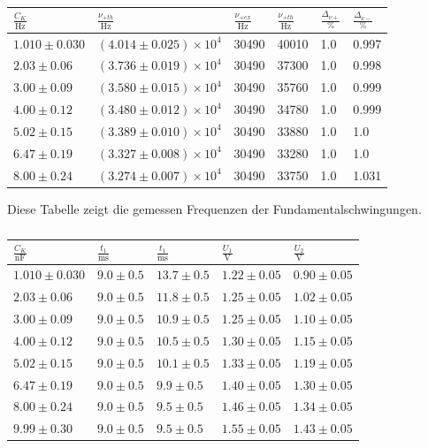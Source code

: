 \documentclass[11pt,ngerman,a4paper]{article}
\begin{document}
 \begin{table}
 \centering
\begin{tabular}{llllll}
\toprule
{$\frac{C_K}{\si{\Hz}}$} & {$\frac{\nu_{+th}}{\si{\Hz}}$} & $\frac{\nu_{+ex}}{\si{\Hz}}$ &$\frac{\nu_{+th}}{\si{\Hz}} $& $\frac{\Delta_{\nu+}}{\si{\percent}}$ &$\frac{\Delta_{\nu-}}{\si{\percent}}$\\
\midrule
 $1.010 \pm 0.030$  & $\left(4.014 \pm 0.025\right) \times 10^{4}$  & 30490 & 40010 & 1.0 & 0.997\\
 $2.03 \pm 0.06$  & $\left(3.736 \pm 0.019\right) \times 10^{4}$  & 30490 & 37300 & 1.0 & 0.998\\
 $3.00 \pm 0.09$  & $\left(3.580 \pm 0.015\right) \times 10^{4}$  & 30490 & 35760 & 1.0 & 0.999\\
 $4.00 \pm 0.12$  & $\left(3.480 \pm 0.012\right) \times 10^{4}$  & 30490 & 34780 & 1.0 & 0.999\\
 $5.02 \pm 0.15$  & $\left(3.389 \pm 0.010\right) \times 10^{4}$  & 30490 & 33880 & 1.0 & 1.0\\
 $6.47 \pm 0.19$  & $\left(3.327 \pm 0.008\right) \times 10^{4}$  & 30490 & 33280 & 1.0 & 1.0\\
 $8.00 \pm 0.24$  & $\left(3.274 \pm 0.007\right) \times 10^{4}$  & 30490 & 33750 & 1.0 & 1.031\\
\bottomrule
\end{tabular}
\label{tab4}
\caption{Diese Tabelle zeigt die gemessen Frequenzen der Fundamentalschwingungen.}

\centering
\begin{tabular}{lllll}
\toprule
{$\frac{C_K}{\si{\nano\farad}}$} &{ $\frac{t_1}{\si{\milli\second}}$} &{ $\frac{t_1}{\si{\milli\second}}$} &{ $\frac{U_1}{\si{\volt}}$} &{ $\frac{U_2}{\si{\volt}}$ }\\
\midrule
 $1.010 \pm 0.030$  & $9.0 \pm 0.5$  & $13.7 \pm 0.5$  & $1.22 \pm 0.05$  & $0.90 \pm 0.05$ \\
 $2.03 \pm 0.06$  & $9.0 \pm 0.5$  & $11.8 \pm 0.5$  & $1.25 \pm 0.05$  & $1.02 \pm 0.05$ \\
 $3.00 \pm 0.09$  & $9.0 \pm 0.5$  & $10.9 \pm 0.5$  & $1.25 \pm 0.05$  & $1.10 \pm 0.05$ \\
 $4.00 \pm 0.12$  & $9.0 \pm 0.5$  & $10.5 \pm 0.5$  & $1.30 \pm 0.05$  & $1.15 \pm 0.05$ \\
 $5.02 \pm 0.15$  & $9.0 \pm 0.5$  & $10.1 \pm 0.5$  & $1.33 \pm 0.05$  & $1.19 \pm 0.05$ \\
 $6.47 \pm 0.19$  & $9.0 \pm 0.5$  & $9.9 \pm 0.5$  & $1.40 \pm 0.05$  & $1.30 \pm 0.05$ \\
 $8.00 \pm 0.24$  & $9.0 \pm 0.5$  & $9.5 \pm 0.5$  & $1.46 \pm 0.05$  & $1.34 \pm 0.05$ \\
 $9.99 \pm 0.30$  & $9.0 \pm 0.5$  & $9.5 \pm 0.5$  & $1.55 \pm 0.05$  & $1.43 \pm 0.05$ \\
\bottomrule
\end{tabular}
\label{tab5}
\caption{}
\end{table}
\end{document}
